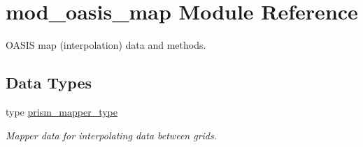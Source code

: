 \hypertarget{namespacemod__oasis__map}{}\section{mod\+\_\+oasis\+\_\+map Module Reference}
\label{namespacemod__oasis__map}


O\+A\+S\+IS map (interpolation) data and methods.  


\subsection*{Data Types}
\begin{DoxyCompactItemize}
\item 
type \hyperlink{structmod__oasis__map_1_1prism__mapper__type}{prism\+\_\+mapper\+\_\+type}
\begin{DoxyCompactList}\small\item\em Mapper data for interpolating data between grids. \end{DoxyCompactList}\end{DoxyCompactItemize}
